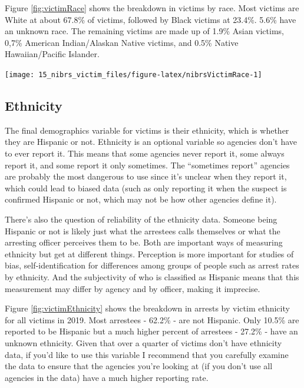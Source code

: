 \documentclass[
]{krantz}
\let\origfigure\figure
\let\endorigfigure\endfigure
\renewenvironment{figure}[1][2] {
    \expandafter\origfigure\expandafter[H]
} {
    \endorigfigure
}
\begin{document}
Figure \ref{fig:victimRace} shows the breakdown in victims
by race. Most victims are White at about 67.8\% of victims,
followed by Black victims at 23.4\%. 5.6\% have an unknown
race. The remaining victims are made up of 1.9\% Asian
victims, 0,7\% American Indian/Alaskan Native victims, and
0.5\% Native Hawaiian/Pacific Islander.

\begin{figure}

{\centering \texttt{[image: 15\_nibrs\_victim\_files/figure-latex/nibrsVictimRace-1]} 

}

\caption{The share of victims by race, 1991-2022.}\label{fig:nibrsVictimRace}
\end{figure}

\subsection{Ethnicity}\label{ethnicity-3}

The final demographics variable for victims is their
ethnicity, which is whether they are Hispanic or not.
Ethnicity is an optional variable so agencies don't have to
ever report it. This means that some agencies never report
it, some always report it, and some report it only
sometimes. The ``sometimes report'' agencies are probably
the most dangerous to use since it's unclear when they
report it, which could lead to biased data (such as only
reporting it when the suspect is confirmed Hispanic or not,
which may not be how other agencies define it).

There's also the question of reliability of the ethnicity
data. Someone being Hispanic or not is likely just what the
arrestees calls themselves or what the arresting officer
perceives them to be. Both are important ways of measuring
ethnicity but get at different things. Perception is more
important for studies of bias, self-identification for
differences among groups of people such as arrest rates by
ethnicity. And the subjectivity of who is classified as
Hispanic means that this measurement may differ by agency
and by officer, making it imprecise.

Figure \ref{fig:victimEthnicity} shows the breakdown in
arrests by victim ethnicity for all victims in 2019. Most
arrestees - 62.2\% - are not Hispanic. Only 10.5\% are
reported to be Hispanic but a much higher percent of
arrestees - 27.2\% - have an unknown ethnicity. Given that
over a quarter of victims don't have ethnicity data, if
you'd like to use this variable I recommend that you
carefully examine the data to ensure that the agencies
you're looking at (if you don't use all agencies in the
data) have a much higher reporting rate.
\end{document}
